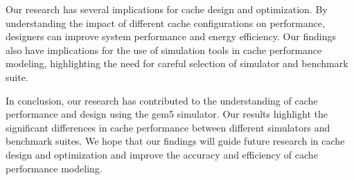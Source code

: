 \documentclass[conference]{IEEEtran}
\begin{document}
Our research has several implications for cache design and optimization. By understanding the impact of different cache configurations on performance, designers can improve system performance and energy efficiency. Our findings also have implications for the use of simulation tools in cache performance modeling, highlighting the need for careful selection of simulator and benchmark suite.

In conclusion, our research has contributed to the understanding of cache performance and design using the gem5 simulator. Our results highlight the significant differences in cache performance between different simulators and benchmark suites. We hope that our findings will guide future research in cache design and optimization and improve the accuracy and efficiency of cache performance modeling.

\printbibliography
\onecolumn

\appendix
\setcounter{table}{0}
\end{document}
